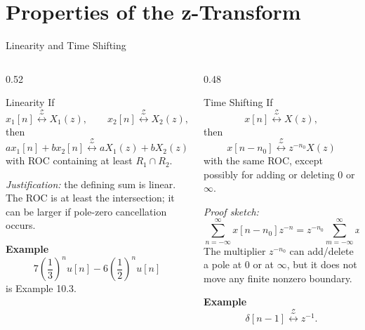 \section{Properties of the z-Transform}

\begin{frame}[t]{Linearity and Time Shifting}
  \small
  \begin{columns}[T]
    \begin{column}{0.52\textwidth}
      \begin{conceptbox}{Linearity}
        If
        \[
          x_1[n]\stackrel{\mathcal{Z}}{\longleftrightarrow}X_1(z), \qquad
          x_2[n]\stackrel{\mathcal{Z}}{\longleftrightarrow}X_2(z),
        \]
        then
        \[
          ax_1[n]+bx_2[n]
          \stackrel{\mathcal{Z}}{\longleftrightarrow}
          aX_1(z)+bX_2(z)
        \]
        with ROC containing at least $R_1\cap R_2$.
      \end{conceptbox}

      \textit{Justification:}
      the defining sum is linear. The ROC is at least the intersection;
      it can be larger if pole-zero cancellation occurs.

      \vspace{0.08cm}
      \textbf{Example}
      \[
        7\left(\frac13\right)^n u[n]-6\left(\frac12\right)^n u[n]
      \]
      is Example 10.3.
    \end{column}
    \begin{column}{0.48\textwidth}
      \begin{conceptbox}{Time Shifting}
        If
        \[
          x[n]\stackrel{\mathcal{Z}}{\longleftrightarrow}X(z),
        \]
        then
        \[
          x[n-n_0]
          \stackrel{\mathcal{Z}}{\longleftrightarrow}
          z^{-n_0}X(z)
        \]
        with the same ROC, except possibly for adding or deleting $0$ or $\infty$.
      \end{conceptbox}

      \textit{Proof sketch:}
      \[
        \sum_{n=-\infty}^{\infty} x[n-n_0]z^{-n}
        = z^{-n_0}\sum_{m=-\infty}^{\infty}x[m]z^{-m}.
      \]
      The multiplier $z^{-n_0}$ can add/delete a pole at $0$ or at $\infty$,
      but it does not move any finite nonzero boundary.

      \vspace{0.08cm}
      \textbf{Example}
      \[
        \delta[n-1]
        \stackrel{\mathcal{Z}}{\longleftrightarrow}
        z^{-1}.
      \]
    \end{column}
  \end{columns}
\end{frame}

